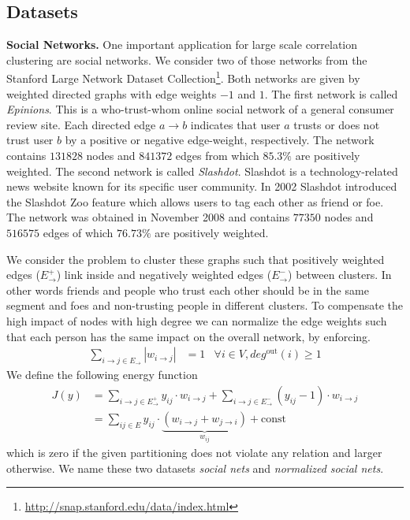 \subsection{Datasets}\label{sec:datasets}
\textbf{Social Networks.}\label{sec:nets}
One important application for large scale correlation clustering are social networks.
We consider two of those networks from the Stanford Large Network Dataset Collection\footnote{\url{http://snap.stanford.edu/data/index.html}}.
Both networks are given by weighted directed graphs with edge weights $-1$ and $1$. 
%
The first network is called \emph{Epinions}. 
This is a who-trust-whom online social network of a general consumer review site. 
Each directed edge $a\to b$ indicates that user $a$ trusts  or does not trust user $b$ by a  positive or negative edge-weight, respectively.
The network contains $131828$ nodes and $841372$ edges from which $85.3\%$ are positively weighted.
%
The second network is called \emph{Slashdot}. 
Slashdot is a technology-related news website known for its specific user community. 
In 2002 Slashdot introduced the Slashdot Zoo feature which allows users to tag each other as friend or foe. 
The network was obtained in November 2008 and contains $77350$ nodes and $516575$ edges of which $76.73\%$ are positively weighted.

We consider the problem to cluster these graphs such that positively weighted edges ($E^+_{\to}$) link inside and negatively weighted edges ($E^-_{\to}$) between clusters.
In other words friends and people who trust each other should be in the same segment and foes and non-trusting people in different clusters.
% 
To compensate the high impact of nodes with high degree we can normalize the edge weights such that each person has the same impact on the overall network, by enforcing.
\begin{align}
  \sum_{i\to j \in E_{\to}} |w_{i\to j}| &= 1&\forall i\in V, deg^{\textrm{out}}(i)\geq 1 
\end{align}
We define the following energy function
\begin{align}
 J(y) &= \sum_{i\to j \in E^+_{\to}} y_{ij}\cdot w_{i \to j} +  \sum_{i\to j \in E^-_{\to}} (y_{ij}-1)\cdot w_{i \to j} \nonumber\\
      &= \sum_{ij \in E} y_{ij}\cdot \underbrace{(w_{i \to j}+w_{j \to i})}_{w_{ij}} + \textrm{const}
\end{align}
which is zero if the given partitioning does not violate any relation and larger otherwise.
We name these two datasets \emph{social nets} and \emph{normalized social nets}.


